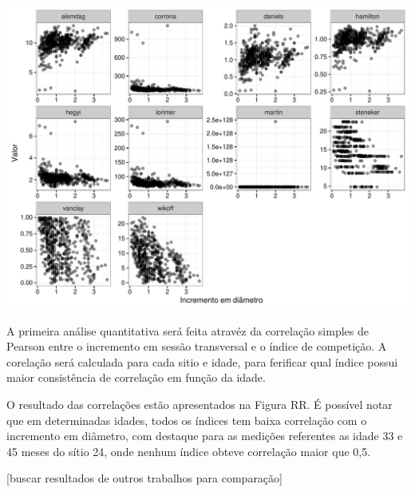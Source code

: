 \documentclass[article]{jss}
\begin{document}
\begin{CodeChunk}


\begin{center}\includegraphics{comp3-paper_files/figure-latex/unnamed-chunk-12-1} \end{center}

\end{CodeChunk}

A primeira análise quantitativa será feita atravéz da correlação simples
de Pearson entre o incremento em sessão transversal e o índice de
competição. A corelação será calculada para cada sitio e idade, para
ferificar qual índice possui maior consistência de correlação em função
da idade.

O resultado das correlações estão apresentados na Figura RR. É possível
notar que em determinadas idades, todos os índices tem baixa correlação
com o incremento em diâmetro, com destaque para as medições referentes
as idade 33 e 45 meses do sítio 24, onde nenhum índice obteve correlação
maior que 0,5.

{[}buscar resultados de outros trabalhos para comparação{]}
\end{document}
